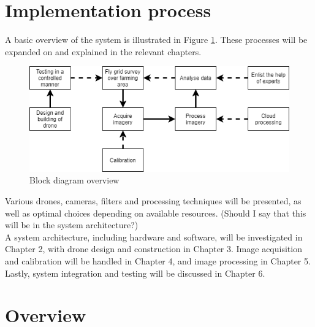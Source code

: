 \section{Implementation process}

A basic overview of the system is illustrated in Figure \ref{fig:overview}. These processes will be expanded on and explained in the relevant chapters.

\begin{figure}[H]
\centering
\includegraphics[scale=0.6]{images/thesis_overview.png}
\caption{Block diagram overview}
\label{fig:overview}
\end{figure}

\noindent
Various drones, cameras, filters and processing techniques will be presented, as well as optimal choices depending on available resources. (Should I say that this will be in the system architecture?)\\

\noindent
A system architecture, including hardware and software, will be investigated in Chapter 2, with drone design and construction in Chapter 3. Image acquisition and calibration will be handled in Chapter 4, and image processing in Chapter 5. Lastly, system integration and testing will be discussed in Chapter 6.

\section{Overview}